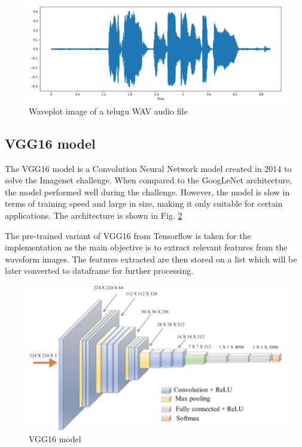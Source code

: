 \documentclass[pdflatex]{sn-jnl}%
\theoremstyle{thmstyleone}%
\theoremstyle{thmstyletwo}%
\theoremstyle{thmstylethree}%
\begin{document}
\begin{figure}[htbp]
	\centerline{\includegraphics[scale=0.5]{wave-aud.png}}
	\caption{Waveplot image of a telugu WAV audio file}
	\label{wave-1}
\end{figure} 

\subsection{VGG16 model}
The VGG16 model is a Convolution Neural Network model created in 2014 to solve the Imagenet challenge.
When compared to the GoogLeNet architecture, the model performed well during the challenge.
However, the model is slow in terms of training speed and large in size, making it only suitable for certain applications. The architecture is shown in Fig. \ref{vgg16}

The pre-trained variant of VGG16 from Tensorflow is taken
for the implementation as the main objective is to extract
relevant features from the waveform images. The features
extracted are then stored on a list which will be later converted
to dataframe for further processing.

\begin{figure}[htbp]
	\centerline{\includegraphics[scale=0.3]{vgg16.jpg}}
	\caption{VGG16 model \cite{b22}}
	\label{vgg16}
\end{figure}
\end{document}
